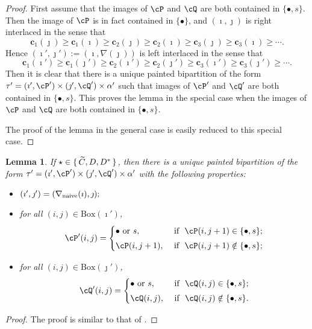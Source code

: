\documentclass[12pt,a4paper]{amsart}
\def\DD{\nabla}
\numberwithin{equation}{section}
\newtheorem{lem}[thm]{Lemma}
\theoremstyle{remark}
\def\BOX{\mathrm{Box}}
\begin{document}
   \begin{proof}
    First assume that the images of $\cP$ and $\cQ$ are both contained in $\{\bullet, s\}$. Then  the image of $\cP$  is in fact contained in $\{\bullet\}$, and $(\imath, \jmath)$ is  right interlaced in the sense that
 \[
 \mathbf{c}_1(\jmath)\geq \mathbf{c}_1(\imath)\geq \mathbf{c}_2(\jmath)\geq \mathbf{c}_2(\imath)\geq \mathbf{c}_3(\jmath)\geq \mathbf{c}_3(\imath) \geq \cdots.
 \]
 Hence $ (\imath',\jmath'):= (\imath,\DD(\jmath))$ is left interlaced in the sense that
 \[
 \mathbf{c}_1(\imath')\geq \mathbf{c}_1(\jmath')\geq \mathbf{c}_2(\imath')\geq \mathbf{c}_2(\jmath')\geq \mathbf{c}_3(\imath')\geq \mathbf{c}_3(\jmath') \geq \cdots.
 \]
 Then it is clear that there is a unique painted bipartition of the form  $\tau'=(\imath',\cP')\times (\jmath',\cQ')\times \alpha'$ such that images of $\cP'$ and $\cQ'$ are both contained in $\{\bullet, s\}$. This proves the lemma in the special case when the images of $\cP$ and $\cQ$ are both contained in $\{\bullet, s\}$.

 The proof of the lemma in the general case is easily reduced to this special case.
   \end{proof}
    \begin{lem}\label{lemDDn2}
    If $\star \in \set{ \widetilde C, D,D^*}$, then there is a unique painted bipartition of the form $\tau'= (\imath',\cP')\times (\jmath',\cQ')\times \alpha'$ with the following properties:
  \begin{itemize}
        \item $
   (\imath',\jmath')= (\DD_\mathrm{naive}(\imath),\jmath); \smallskip
   $
   \item for all $(i,j)\in \BOX(\imath')$,
   \[
     \cP'(i,j)=\begin{cases}
    \bullet \textrm{ or } s,&\textrm{ if  $\ \cP(i,j+1)\in \{\bullet, s\}$;} \smallskip \\
  \cP(i,j+1),& \textrm{ if $\ \cP(i,j+1)\notin \{\bullet, s\}$};\end{cases}
   \]
   \item for all $(i,j)\in \BOX(\jmath')$,
   \[
     \cQ'(i,j)=\begin{cases}
    \bullet \textrm{ or } s,&\textrm{ if  $\ \cQ(i,j)\in \{\bullet, s\}$;} \smallskip \\
  \cQ(i,j), & \textrm{ if $\ \cQ(i,j)\notin \{\bullet, s\}$}.  \end{cases}
   \]

    \end{itemize}
\end{lem}
\begin{proof}
  The proof is similar to that of .
\end{proof}
\end{document}
